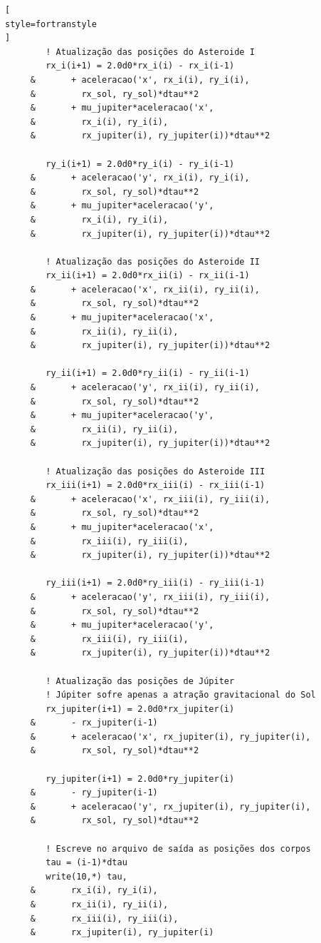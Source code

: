 \documentclass[12pt,a4paper]{article}
\begin{document}
\begin{lstlisting}[
style=fortranstyle
]
        ! Atualização das posições do Asteroide I
        rx_i(i+1) = 2.0d0*rx_i(i) - rx_i(i-1)
     &       + aceleracao('x', rx_i(i), ry_i(i),
     &         rx_sol, ry_sol)*dtau**2
     &       + mu_jupiter*aceleracao('x',
     &         rx_i(i), ry_i(i),
     &         rx_jupiter(i), ry_jupiter(i))*dtau**2

        ry_i(i+1) = 2.0d0*ry_i(i) - ry_i(i-1)
     &       + aceleracao('y', rx_i(i), ry_i(i),
     &         rx_sol, ry_sol)*dtau**2
     &       + mu_jupiter*aceleracao('y',
     &         rx_i(i), ry_i(i),
     &         rx_jupiter(i), ry_jupiter(i))*dtau**2

        ! Atualização das posições do Asteroide II
        rx_ii(i+1) = 2.0d0*rx_ii(i) - rx_ii(i-1)
     &       + aceleracao('x', rx_ii(i), ry_ii(i),
     &         rx_sol, ry_sol)*dtau**2
     &       + mu_jupiter*aceleracao('x',
     &         rx_ii(i), ry_ii(i),
     &         rx_jupiter(i), ry_jupiter(i))*dtau**2

        ry_ii(i+1) = 2.0d0*ry_ii(i) - ry_ii(i-1)
     &       + aceleracao('y', rx_ii(i), ry_ii(i),
     &         rx_sol, ry_sol)*dtau**2
     &       + mu_jupiter*aceleracao('y',
     &         rx_ii(i), ry_ii(i),
     &         rx_jupiter(i), ry_jupiter(i))*dtau**2

        ! Atualização das posições do Asteroide III
        rx_iii(i+1) = 2.0d0*rx_iii(i) - rx_iii(i-1)
     &       + aceleracao('x', rx_iii(i), ry_iii(i),
     &         rx_sol, ry_sol)*dtau**2
     &       + mu_jupiter*aceleracao('x',
     &         rx_iii(i), ry_iii(i),
     &         rx_jupiter(i), ry_jupiter(i))*dtau**2

        ry_iii(i+1) = 2.0d0*ry_iii(i) - ry_iii(i-1)
     &       + aceleracao('y', rx_iii(i), ry_iii(i),
     &         rx_sol, ry_sol)*dtau**2
     &       + mu_jupiter*aceleracao('y',
     &         rx_iii(i), ry_iii(i),
     &         rx_jupiter(i), ry_jupiter(i))*dtau**2

        ! Atualização das posições de Júpiter
        ! Júpiter sofre apenas a atração gravitacional do Sol
        rx_jupiter(i+1) = 2.0d0*rx_jupiter(i)
     &       - rx_jupiter(i-1)
     &       + aceleracao('x', rx_jupiter(i), ry_jupiter(i),
     &         rx_sol, ry_sol)*dtau**2

        ry_jupiter(i+1) = 2.0d0*ry_jupiter(i)
     &       - ry_jupiter(i-1)
     &       + aceleracao('y', rx_jupiter(i), ry_jupiter(i),
     &         rx_sol, ry_sol)*dtau**2

        ! Escreve no arquivo de saída as posições dos corpos
        tau = (i-1)*dtau
        write(10,*) tau,
     &       rx_i(i), ry_i(i),
     &       rx_ii(i), ry_ii(i),
     &       rx_iii(i), ry_iii(i),
     &       rx_jupiter(i), ry_jupiter(i)


\end{lstlisting}
\end{document}
